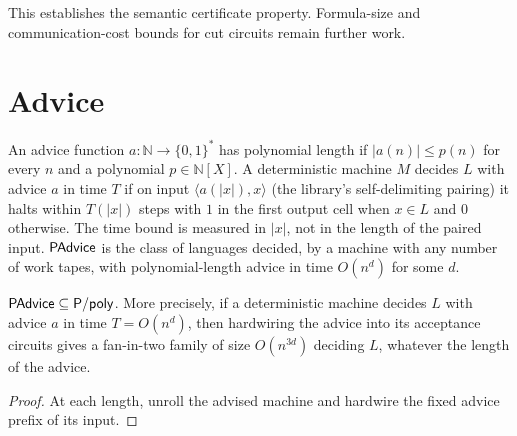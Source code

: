 This establishes the semantic certificate property. Formula-size and
communication-cost bounds for cut circuits remain further work.

\section{Advice}
\label{sec:circuits-advice}

\begin{definition}
  \label{def:PAdvice}
  \leanok
  An advice function $a : \mathbb{N} \to \{0,1\}^*$ has polynomial length if
  $|a(n)| \le p(n)$ for every $n$ and a polynomial $p \in \mathbb{N}[X]$. A
  deterministic machine $M$ decides $L$ with advice $a$ in time $T$ if on input
  $\langle a(|x|), x \rangle$ (the library's self-delimiting pairing) it halts
  within $T(|x|)$ steps with $1$ in the first output cell when $x \in L$ and
  $0$ otherwise. The time bound is measured in $|x|$, not in the length of the
  paired input. $\mathsf{PAdvice}$ is the class of languages decided, by a machine
  with any number of work tapes, with polynomial-length advice in time
  $O(n^d)$ for some $d$.
\end{definition}

\begin{theorem}
  \label{thm:circuits-padvice-subset-ppoly}
  \leanok
  $\mathsf{PAdvice} \subseteq \mathsf{P/poly}$. More precisely, if a deterministic
  machine decides $L$ with advice $a$ in time $T = O(n^d)$, then hardwiring
  the advice into its acceptance circuits gives a fan-in-two family of size
  $O(n^{3d})$ deciding $L$, whatever the length of the advice.
\end{theorem}
\begin{proof}
  \leanok
  At each length, unroll the advised machine and hardwire the fixed advice
  prefix of its input.
\end{proof}

